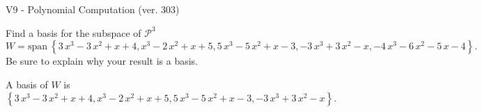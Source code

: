 \begin{exercise}
  \begin{exerciseTitle}V9 - Polynomial Computation (ver. 303)\end{exerciseTitle}
  \begin{exerciseStatement}
    Find a basis for the subspace of \(\mathcal{P}^3\) 
\[W=\mathrm{span}\ \left\{3 \, x^{3} - 3 \, x^{2} + x + 4 , x^{3} - 2 \, x^{2} + x + 5 , 5 \, x^{3} - 5 \, x^{2} + x - 3 , -3 \, x^{3} + 3 \, x^{2} - x , -4 \, x^{3} - 6 \, x^{2} - 5 \, x - 4\right\}.\]
 Be sure to explain why your result is a basis.


  \end{exerciseStatement}
  \begin{exerciseAnswer}
   A basis of \(W\) is  \(\left\{3 \, x^{3} - 3 \, x^{2} + x + 4 , x^{3} - 2 \, x^{2} + x + 5 , 5 \, x^{3} - 5 \, x^{2} + x - 3 , -3 \, x^{3} + 3 \, x^{2} - x\right\}\).
  


  \end{exerciseAnswer}
\end{exercise}